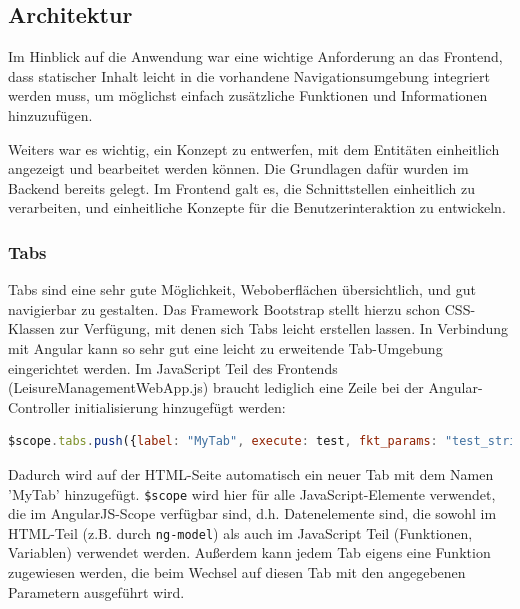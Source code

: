 \subsection{Architektur}

Im Hinblick auf die Anwendung war eine wichtige Anforderung an das Frontend, dass statischer Inhalt leicht in die vorhandene Navigationsumgebung integriert werden muss, um möglichst einfach zusätzliche Funktionen und Informationen hinzuzufügen.

Weiters war es wichtig, ein Konzept zu entwerfen, mit dem Entitäten einheitlich angezeigt und bearbeitet werden können. Die Grundlagen dafür wurden im Backend bereits gelegt. Im Frontend galt es, die Schnittstellen einheitlich zu verarbeiten, und einheitliche Konzepte für die Benutzerinteraktion zu entwickeln.

\subsubsection{Tabs}
Tabs sind eine sehr gute Möglichkeit, Weboberflächen übersichtlich, und gut navigierbar zu gestalten. Das Framework Bootstrap stellt hierzu schon CSS-Klassen zur Verfügung, mit denen sich Tabs leicht erstellen lassen. In Verbindung mit Angular kann so sehr gut eine leicht zu erweitende Tab-Umgebung eingerichtet werden. Im JavaScript Teil des Frontends (LeisureManagementWebApp.js) braucht lediglich eine Zeile bei der Angular-Controller initialisierung hinzugefügt werden:

\scriptsize
\begin{lstlisting}[language=Javascript]
$scope.tabs.push({label: "MyTab", execute: test, fkt_params: "test_string"});
\end{lstlisting}
\normalsize

Dadurch wird auf der HTML-Seite automatisch ein neuer Tab mit dem Namen 'MyTab' hinzugefügt. \verb|$scope| wird hier für alle JavaScript-Elemente verwendet, die im AngularJS-Scope verfügbar sind, d.h. Datenelemente sind, die sowohl im HTML-Teil (z.B. durch \verb|ng-model|) als auch im JavaScript Teil (Funktionen, Variablen) verwendet werden. Außerdem kann jedem Tab eigens eine Funktion zugewiesen werden, die beim Wechsel auf diesen Tab mit den angegebenen Parametern ausgeführt wird. 

